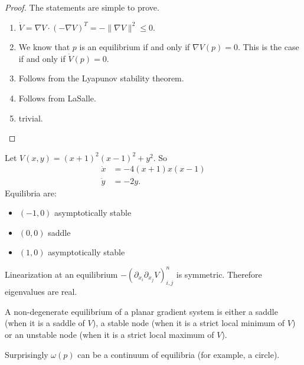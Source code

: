\documentclass{article}
\begin{document}
\begin{proof}
    The statements are simple to prove.
    \begin{enumerate}
        \item $\dot V = \nabla V\cdot(-\nabla V)^T = -\|\nabla V\|^2 \leq 0$.

        \item We know that $p$ is an equilibrium if and only if $\nabla V(p) = 0$. This is the case if and only if $\dot V(p) = 0$.

        \item Follows from the Lyapunov stability theorem.

        \item Follows from LaSalle.

        \item trivial.
    \end{enumerate}
\end{proof}

\begin{exam}
    Let $V(x,y) = (x+1)^2(x-1)^2+y^2$. So
    $$\begin{aligned}
        \dot x &= -4(x+1)x(x-1)\\
        \dot y &= -2y.
    \end{aligned}$$
    Equilibria are:
    \begin{itemize}
        \item $(-1,0)$ asymptotically stable

        \item $(0,0)$ saddle

        \item $(1,0)$ asymptotically stable
    \end{itemize}
\end{exam}

Linearization at an equilibrium $-(\partial_{x_i}\partial_{x_j}V)_{i,j}^n$ is symmetric. Therefore eigenvalues are real.

\begin{thm}
    A non-degenerate equilibrium of a planar gradient system is either a saddle (when it is a saddle of $V$), a stable node (when it is a strict local minimum of $V$) or an unstable node (when it is a strict local maximum of $V$).
\end{thm}

\begin{rem}
    Surprisingly $\omega(p)$ can be a continuum of equilibria (for example, a circle).
\end{rem}
\end{document}
